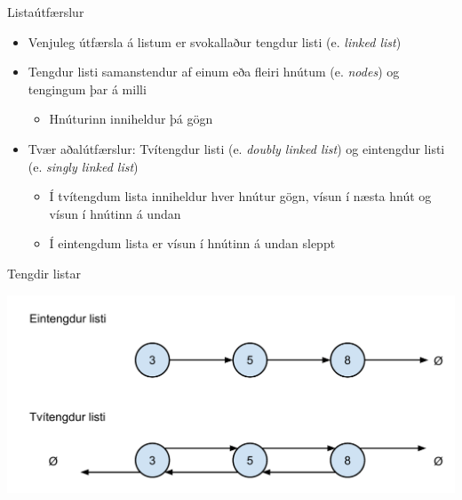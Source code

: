 \documentclass{beamer}
\begin{document}
\begin{frame}{Listaútfærslur}
\begin{itemize}
 \item Venjuleg útfærsla á listum er svokallaður tengdur listi (e. \emph{ linked list})
 \item Tengdur listi samanstendur af einum eða fleiri hnútum (e. \emph{nodes}) og tengingum þar á milli
 \begin{itemize}
  \item Hnúturinn inniheldur þá gögn
 \end{itemize}
 \item Tvær aðalútfærslur: Tvítengdur listi (e. \emph{doubly linked list}) og eintengdur listi (e. \emph{singly linked list})
 \begin{itemize}
  \item Í tvítengdum lista inniheldur hver hnútur gögn, vísun í næsta hnút og vísun í hnútinn á undan
  \item Í eintengdum lista er vísun í hnútinn á undan sleppt
 \end{itemize}
\end{itemize}
\end{frame}

\begin{frame}{Tengdir listar}
\begin{center}
\includegraphics[width=\textwidth]{Pics/listar}
\end{center}
\end{frame}
\end{document}
